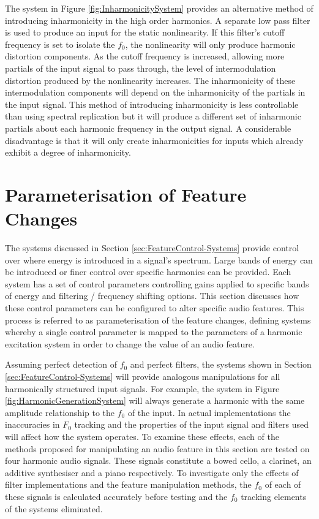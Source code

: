 		The system in Figure \ref{fig:InharmonicitySystem} provides an alternative method of introducing
		inharmonicity in the high order harmonics. A separate low pass filter is used to produce an input for the
		static nonlinearity. If this filter's cutoff frequency is set to isolate the $f_{0}$, the nonlinearity will
		only produce harmonic distortion components. As the cutoff frequency is increased, allowing more partials
		of the input signal to pass through, the level of intermodulation distortion produced by the nonlinearity
		increases. The inharmonicity of these intermodulation components will depend on the inharmonicity of the
		partials in the input signal. This method of introducing inharmonicity is less controllable than using
		spectral replication but it will produce a different set of inharmonic partials about each harmonic
		frequency in the output signal. A considerable disadvantage is that it will only create inharmonicities for
		inputs which already exhibit a degree of inharmonicity.

\section{Parameterisation of Feature Changes}
\label{sec:FeatureControl-Parameterisation}
	The systems discussed in Section \ref{sec:FeatureControl-Systems} provide control over where energy is introduced
	in a signal's spectrum. Large bands of energy can be introduced or finer control over specific harmonics can be
	provided. Each system has a set of control parameters controlling gains applied to specific bands of energy and
	filtering / frequency shifting options. This section discusses how these control parameters can be configured to
	alter specific audio features. This process is referred to as parameterisation of the feature changes, defining
	systems whereby a single control parameter is mapped to the parameters of a harmonic excitation system in order to
	change the value of an audio feature.

	Assuming perfect detection of $f_{0}$ and perfect filters, the systems shown in Section
	\ref{sec:FeatureControl-Systems} will provide analogous manipulations for all harmonically structured input
	signals. For example, the system in Figure \ref{fig:HarmonicGenerationSystem} will always generate a harmonic with
	the same amplitude relationship to the $f_{0}$ of the input. In actual implementations the inaccuracies in $F_{0}$
	tracking and the properties of the input signal and filters used will affect how the system operates. To examine
	these effects, each of the methods proposed for manipulating an audio feature in this section are tested on four
	harmonic audio signals. These signals constitute a bowed cello, a clarinet, an additive synthesiser and a piano
	respectively. To investigate only the effects of filter implementations and the feature manipulation methods, the
	$f_{0}$ of each of these signals is calculated accurately before testing and the $f_{0}$ tracking elements of the
	systems eliminated.

